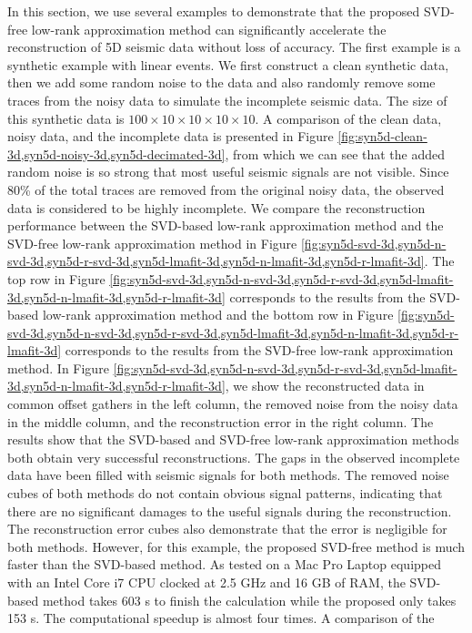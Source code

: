 In this section, we use several  examples to demonstrate that the proposed SVD-free low-rank approximation method can significantly accelerate the reconstruction of 5D seismic data without loss of accuracy.  The first example is a synthetic example with linear events. We first construct a clean synthetic data, then we add some random noise to the data and also randomly remove some traces from the noisy data to simulate the incomplete seismic data. The size of this synthetic data is $100\times10\times10\times10\times10$. A comparison of the clean data, noisy data, and the incomplete data is presented in Figure \ref{fig:syn5d-clean-3d,syn5d-noisy-3d,syn5d-decimated-3d}, from which we can see that the added random noise is so strong that most useful seismic signals are not visible. Since 80\% of the total traces are removed from the original noisy data, the observed data is considered to be highly incomplete. We compare the reconstruction performance between the SVD-based low-rank approximation method and the SVD-free  low-rank approximation method in Figure \ref{fig:syn5d-svd-3d,syn5d-n-svd-3d,syn5d-r-svd-3d,syn5d-lmafit-3d,syn5d-n-lmafit-3d,syn5d-r-lmafit-3d}. The top row in Figure \ref{fig:syn5d-svd-3d,syn5d-n-svd-3d,syn5d-r-svd-3d,syn5d-lmafit-3d,syn5d-n-lmafit-3d,syn5d-r-lmafit-3d} corresponds to the results from the SVD-based low-rank approximation method and the bottom row in Figure \ref{fig:syn5d-svd-3d,syn5d-n-svd-3d,syn5d-r-svd-3d,syn5d-lmafit-3d,syn5d-n-lmafit-3d,syn5d-r-lmafit-3d} corresponds to the results from the SVD-free low-rank approximation method. In  Figure \ref{fig:syn5d-svd-3d,syn5d-n-svd-3d,syn5d-r-svd-3d,syn5d-lmafit-3d,syn5d-n-lmafit-3d,syn5d-r-lmafit-3d}, we show the reconstructed data in common offset gathers in the left column, the removed noise from the noisy data in the middle column, and the reconstruction error in the right column. The results show that the SVD-based and SVD-free low-rank approximation methods both obtain very successful reconstructions. The gaps in the observed incomplete data have been filled with seismic signals for both methods. The removed noise cubes of both methods do not contain obvious signal patterns, indicating that there are no significant damages to the useful signals during the reconstruction. The reconstruction error cubes also demonstrate that the error is negligible for both methods. However, for this example, the proposed SVD-free method is much faster than the SVD-based method. As tested on a Mac Pro Laptop equipped with an Intel Core i7 CPU clocked at 2.5 GHz and 16 GB of RAM, the SVD-based method takes 603 s to finish the calculation while the proposed only takes 153 s. The computational speedup is almost four times. A comparison of the 